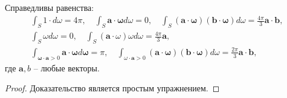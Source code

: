 \begin{lemma}
    \label{lm:1:1}
    Справедливы равенства:
    \[
        \begin{gathered}
            \int_{S} 1 \cdot d \omega=4 \pi, \quad \int_{S} \mathbf{a}
            \cdot \boldsymbol{\omega} d \omega=0,
            \quad \int_{S}(\mathbf{a} \cdot \boldsymbol{\omega})(\mathbf{b} \cdot \boldsymbol{\omega}) d
            \omega=\frac{4 \pi}{3} \mathbf{a} \cdot \mathbf{b}, \\
            \int_{S} \omega d \omega=0, \quad \int_{S}(\mathbf{a} \cdot \omega) \omega d
            \omega=\frac{4 \pi}{3} \mathbf{a}, \\
            \int_{\boldsymbol{\omega} \cdot \mathbf{a}>0} \mathbf{a} \cdot \boldsymbol{\omega} d
            \boldsymbol{\omega}=\pi, \quad \int_{\omega \cdot \mathbf{a}>0}(\mathbf{a} \cdot
            \boldsymbol{\omega})(\mathbf{b} \cdot \boldsymbol{\omega}) d \omega
            =\frac{2 \pi}{3} \mathbf{a} \cdot \mathbf{b},
        \end{gathered}
    \]
    где $\mathbf{a}, b$ -- любые векторы.
\end{lemma}
\begin{proof} Доказательство является простым упражнением.\end{proof}
%
%
%
